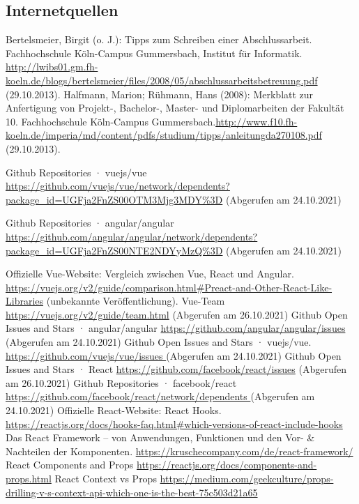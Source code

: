      \subsection{Internetquellen}
     \begin{thebibliography}{HR08} %
         Bertelsmeier, Birgit (o. J.): Tipps zum Schrei\-b\-en ei\-n\-er Ab\-sch\-luss\-ar\-beit. Fach\-hoch\-schu\-le Köln-Campus Gummersbach, Institut für Informatik. \url{http://lwibs01.gm.fh-koeln.de/blogs/bertelsmeier/files/2008/05/abschlussarbeitsbetreuung.pdf} (29.10.2013).
          Halfmann, Marion; Rühmann, Hans (2008): Merkblatt zur Anfertigung von Projekt-, Bachelor-, Master- und Diplomarbeiten der Fakultät 10. Fachhochschule Köln-Campus Gummersbach.\url{http://www.f10.fh-koeln.de/imperia/md/content/pdfs/studium/tipps/anleitungda270108.pdf} (29.10.2013).

          Github Repositories · vuejs/vue \url{ https://github.com/vuejs/vue/network/dependents?package_id=UGFja2FnZS00OTM3Mjg3MDY\%3D}
         (Abgerufen am 24.10.2021)

          Github Repositories · angular/angular \url{https://github.com/angular/angular/network/dependents?package_id=UGFja2FnZS00NTE2NDYyMzQ%3D}
         (Abgerufen am 24.10.2021)

          Offizielle Vue-Website: Vergleich zwischen Vue, React und Angular. \url{https://vuejs.org/v2/guide/comparison.html#Preact-and-Other-React-Like-Libraries} (unbekannte Veröffentlichung).
          Vue-Team \url{https://vuejs.org/v2/guide/team.html} (Abgerufen am 26.10.2021)
         Github Open Issues and Stars · angular/angular \url{ https://github.com/angular/angular/issues }  (Abgerufen am 24.10.2021)
          Github Open Issues and Stars · vuejs/vue. \url{ https://github.com/vuejs/vue/issues }  (Abgerufen am 24.10.2021)
          Github Open Issues and Stars · React \url{https://github.com/facebook/react/issues} (Abgerufen am 26.10.2021)
          Github Repositories · facebook/react \url{ https://github.com/facebook/react/network/dependents } (Abgerufen am 24.10.2021)
          Offizielle React-Website: React Hooks. \url{https://reactjs.org/docs/hooks-faq.html#which-versions-of-react-include-hooks}
          Das React Framework – von Anwendungen, Funktionen und den Vor- & Nachteilen der Komponenten. \url{https://kruschecompany.com/de/react-framework/}
          React Components and Props \url{https://reactjs.org/docs/components-and-props.html}
          React Context vs Props \url{https://medium.com/geekculture/props-drilling-v-s-context-api-which-one-is-the-best-75c503d21a65}


\end{thebibliography}
